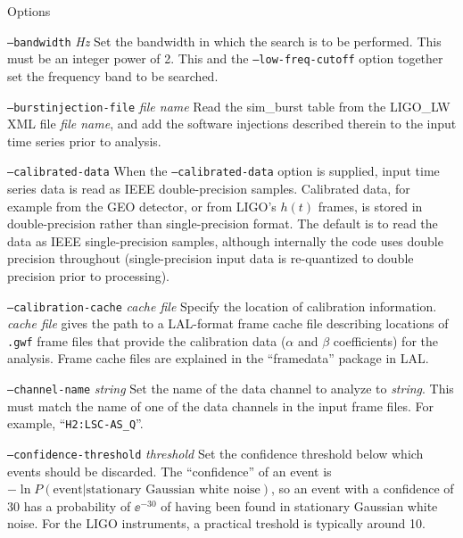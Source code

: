 \documentclass[10pt]{article}
\newcommand{\option}[1]{\texttt{#1}}
\newcommand{\parm}[1]{\textit{#1}}
\newenvironment{entry}%
{\begin{list}{}{\renewcommand{\makelabel}[1]%
{\parbox[b]{\labelwidth}{\makebox[0pt][l]{\textbf{##1}}\\}}%
\setlength{\labelwidth}{1em}%
\setlength{\labelsep}{1em}%
\setlength{\leftmargin}{2em}%
\setlength{\topsep}{\medskipamount}%
\setlength{\itemsep}{\medskipamount}%
\setlength{\parsep}{\medskipamount}%
\setlength{\listparindent}{0pt}}}
{\end{list}}
\begin{document}
\begin{entry}
\item[Options]\leavevmode
\begin{entry}
\item[\option{--bandwidth} \parm{Hz}]
Set the bandwidth in which the search is to be performed.  This must be an
integer power of 2.  This and the \option{--low-freq-cutoff} option
together set the frequency band to be searched.

\item[\option{--burstinjection-file} \parm{file name}]
Read the sim\_burst table from the LIGO\_LW XML file \parm{file name}, and
add the software injections described therein to the input time series
prior to analysis.

\item[\option{--calibrated-data}]
When the \option{--calibrated-data} option is supplied, input time series
data is read as IEEE double-precision samples.  Calibrated data, for
example from the GEO detector, or from LIGO's \(h(t)\) frames, is stored in
double-precision rather than single-precision format.  The default is to
read the data as IEEE single-precision samples, although internally the
code uses double precision throughout (single-precision input data is
re-quantized to double precision prior to processing).

\item[\option{--calibration-cache} \parm{cache file}]
Specify the location of calibration information.  \parm{cache file} gives
the path to a LAL-format frame cache file describing locations of
\texttt{.gwf} frame files that provide the calibration data ($\alpha$ and
$\beta$ coefficients) for the analysis.  Frame cache files are explained in
the ``framedata'' package in LAL.

\item[\option{--channel-name} \parm{string}]
Set the name of the data channel to analyze to \parm{string}.  This must
match the name of one of the data channels in the input frame files.  For
example, ``\verb|H2:LSC-AS_Q|''.

\item[\option{--confidence-threshold} \parm{threshold}]
Set the confidence threshold below which events should be discarded.  The
``confidence'' of an event is \(-\ln P(\text{event} | \text{stationary
Gaussian white noise})\), so an event with a confidence of 30 has a
probability of \(\ee^{-30}\) of having been found in stationary Gaussian
white noise.  For the LIGO instruments, a practical treshold is typically
around 10.


\end{entry}
\end{entry}
\end{document}
